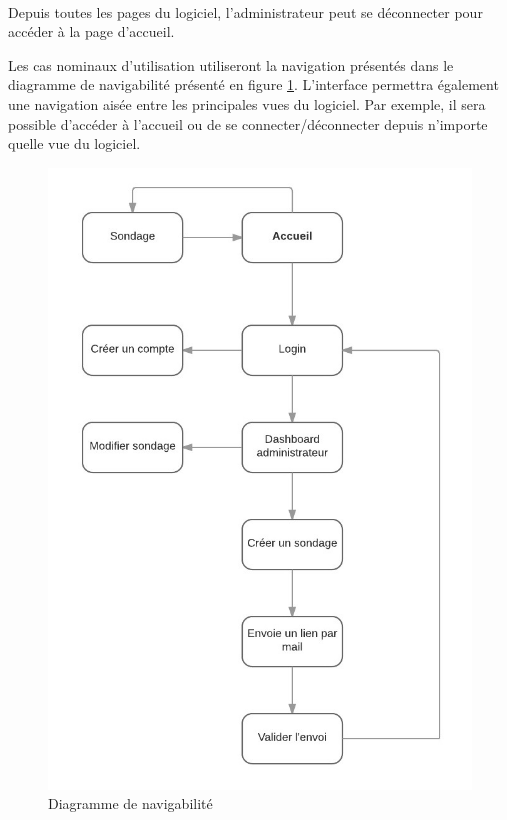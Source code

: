 \documentclass[titlepage]{report}
\begin{document}
\paragraph{}Depuis toutes les pages du logiciel, l'administrateur peut se déconnecter pour accéder à la page d'accueil.
\par Les cas nominaux d'utilisation utiliseront la navigation présentés dans le diagramme de navigabilité présenté en figure \ref{diagramme_navigabilite}. L'interface permettra également une navigation aisée entre les principales vues du logiciel. 
Par exemple, il sera possible d'accéder à l'accueil ou de se connecter/déconnecter depuis n'importe quelle vue du logiciel.

\begin{figure}[h]
	\caption{Diagramme de navigabilité}
	\label{diagramme_navigabilite}
	\centering
	\includegraphics[scale=1]{figures/diagrammes/navigabilite.png}
\end{figure}
\end{document}
